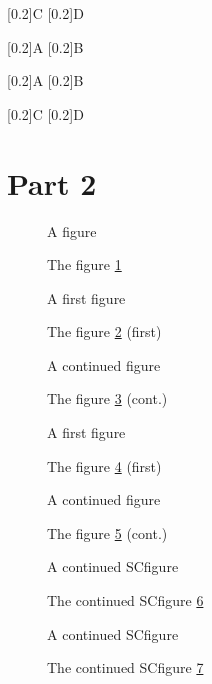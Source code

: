 \documentclass[a4paper]{article}
\begin{document}
\begin{table}[H]
\ContinuedFloat
\caption{A table (cont.)}
\centering
\subcaptionbox{}[0.2\textwidth]{C}
\subcaptionbox{}[0.2\textwidth]{D}
\bigskip
\caption{A table} %
\subcaptionbox{}[0.2\textwidth]{A}
\subcaptionbox{}[0.2\textwidth]{B}
\end{table}

\captionsetup[table]{position=t}

\begin{table}
\centering
\caption{A table}
\subcaptionbox{}[0.2\textwidth]{A}
\subcaptionbox{}[0.2\textwidth]{B}
\end{table}

\begin{table}
\ContinuedFloat
\centering
\caption{A table}
\subcaptionbox{}[0.2\textwidth]{C}
\subcaptionbox{}[0.2\textwidth]{D}
\end{table}

\clearpage
\section{Part 2}

\begin{figure}[H]
\centering A figure
\caption{The figure \ref{figure1}}
\label{figure1}
\end{figure}

\begin{figure}[H]
\ContinuedFloat*
\centering A first figure
\caption{The figure \ref{figure1.1} (first)}
\label{figure1.1}
\end{figure}

\begin{figure}[H]
\ContinuedFloat
\centering A continued figure
\caption{The figure \ref{cont1.1} (cont.)}
\label{cont1.1}
\end{figure}

\begin{figure}[H]
\ContinuedFloat*
\centering A first figure
\caption{The figure \ref{figure1.2} (first)}
\label{figure1.2}
\end{figure}

\begin{figure}[H]
\ContinuedFloat
\centering A continued figure
\caption{The figure \ref{cont1.2} (cont.)}
\label{cont1.2}
\end{figure}

\ifx\SCfigure\undefined \else
\begin{figure}
\ContinuedFloat
\centering A continued SCfigure
\caption{The continued SCfigure \ref{SCcont1}}
\label{SCcont1}
\end{figure}
\begin{figure}
\ContinuedFloat
\centering A continued SCfigure
\caption{The continued SCfigure \ref{SCcont2}\label{SCcont2}}
\end{figure}
\fi
\end{document}
